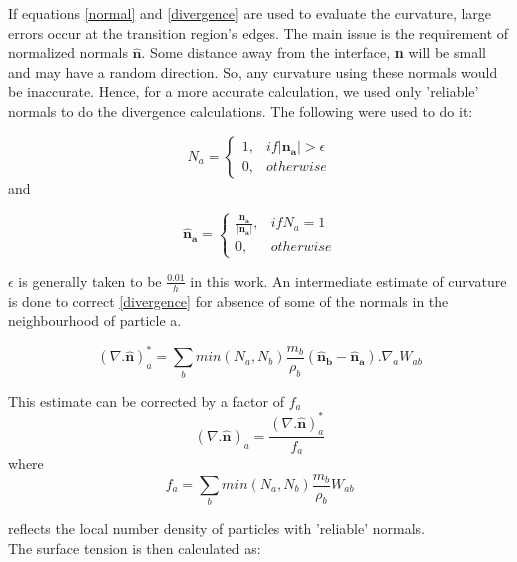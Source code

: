 If equations \ref{normal} and \ref{divergence} are used to evaluate the curvature, large errors occur at the transition region's edges. The main issue is the requirement of normalized normals $\mathbf{\hat n}$. Some distance away from the interface, \textbf{n} will be small and may have a random direction. So, any curvature using these normals would be inaccurate. Hence, for a more accurate calculation, we used only 'reliable' normals to do the divergence calculations. The following were used to do it:

\begin{equation}
 N_a = 
 \begin{cases}
  1, & if \left|\mathbf{n_a}\right| > \epsilon \\
  0, & otherwise
 \end{cases}
  \label{reliablity}
 \end{equation}
\noindent
and

\begin{equation}
 \mathbf{\hat n_a} = 
 \begin{cases}
  \frac{\mathbf{n_a}}{\left| \mathbf{n_a} \right|}, & if N_a=1 \\
  0, & otherwise
 \end{cases}
\end{equation}

\noindent
$\epsilon$ is generally taken to be $\frac{0.01}{h}$ in this work. An intermediate estimate of curvature is done to correct \ref{divergence} for absence of some of the normals in the neighbourhood of particle a.

\begin{equation}
 \left(\nabla. \mathbf{\hat n}\right)^*_a = \sum_b min(N_a, N_b) \frac{m_b}{\rho_b}(\mathbf{\hat n_b} - \mathbf{\hat n_a}). \nabla_a W_{ab}
\end{equation}

This estimate can be corrected by a factor of $f_a$
\begin{equation}
 (\nabla . \mathbf{\hat n})_a = \frac{(\nabla . \mathbf{\hat n})_a^*}{f_a}
\end{equation}
\noindent
where
\begin{equation}
 f_a = \sum_b min(N_a, N_b) \frac{m_b}{\rho_b} W_{ab}
\end{equation}

\noindent
reflects the local number density of particles with 'reliable' normals. \\

The surface tension is then calculated as:

